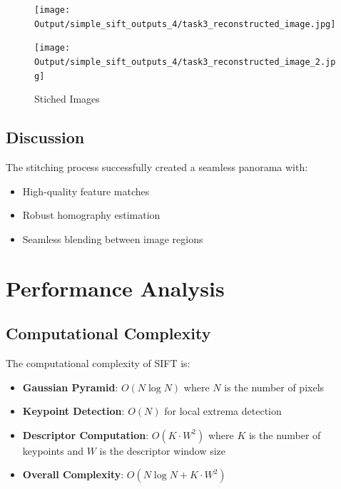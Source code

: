 \documentclass[12pt,a4paper]{article}
\begin{document}


\begin{figure}[!ht]
    \centering
    \caption{Stiched Images}
    \begin{minipage}{0.48\linewidth}
        \centering
        \texttt{[image: Output/simple\_sift\_outputs\_4/task3\_reconstructed\_image.jpg]}
    \end{minipage}
    \hfill
    \begin{minipage}{0.48\linewidth}
        \centering
        \texttt{[image: Output/simple\_sift\_outputs\_4/task3\_reconstructed\_image\_2.jpg]}
    \end{minipage}
    \label{fig:fig14}
\end{figure}


\subsection{Discussion}

The stitching process successfully created a seamless panorama with:
\begin{itemize}
    \item High-quality feature matches
    \item Robust homography estimation
    \item Seamless blending between image regions
\end{itemize}


\section{Performance Analysis}

\subsection{Computational Complexity}

The computational complexity of SIFT is:
\begin{itemize}
    \item \textbf{Gaussian Pyramid}: $O(N \log N)$ where $N$ is the number of pixels
    \item \textbf{Keypoint Detection}: $O(N)$ for local extrema detection
    \item \textbf{Descriptor Computation}: $O(K \cdot W^2)$ where $K$ is the number of keypoints and $W$ is the descriptor window size
    \item \textbf{Overall Complexity}: $O(N \log N + K \cdot W^2)$
\end{itemize}
\end{document}
